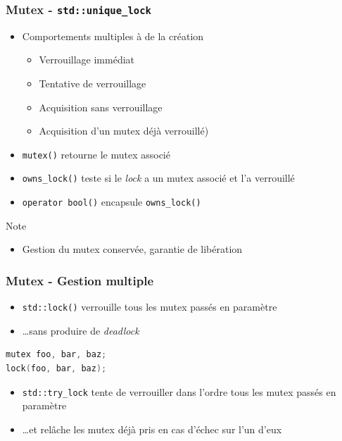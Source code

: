 \documentclass[C++.tex]{subfiles}
\begin{document}
\begin{frame}[fragile]
	\frametitle{Mutex - \lstinline|std::unique_lock|}
	\begin{itemize}
		\item Comportements multiples à de la création
		\begin{itemize}
			\item Verrouillage immédiat
			\item Tentative de verrouillage
			\item Acquisition sans verrouillage
			\item Acquisition d'un mutex déjà verrouillé)
		\end{itemize}
		\item \lstinline|mutex()| retourne le mutex associé
		\item \lstinline|owns_lock()| teste si le \textit{lock} a un mutex associé et l'a verrouillé
		\item \lstinline|operator bool()| encapsule \lstinline|owns_lock()|
	\end{itemize}

	\begin{block}{Note}
		\begin{itemize}
			\item Gestion du mutex conservée, garantie de libération
		\end{itemize}
	\end{block}
\end{frame}

\begin{frame}[fragile]
	\frametitle{Mutex - Gestion multiple}
	\begin{itemize}
		\item \lstinline|std::lock()| verrouille tous les mutex passés en paramètre
		\item \ldots{}sans produire de \textit{deadlock}
	\end{itemize}

	\begin{lstlisting}[language=C++]
mutex foo, bar, baz;
lock(foo, bar, baz);\end{lstlisting}

	\begin{itemize}
		\item \lstinline|std::try_lock| tente de verrouiller dans l'ordre tous les mutex passés en paramètre
		\item \ldots{}et relâche les mutex déjà pris en cas d'échec sur l'un d'eux
	\end{itemize}
\end{frame}
\end{document}
